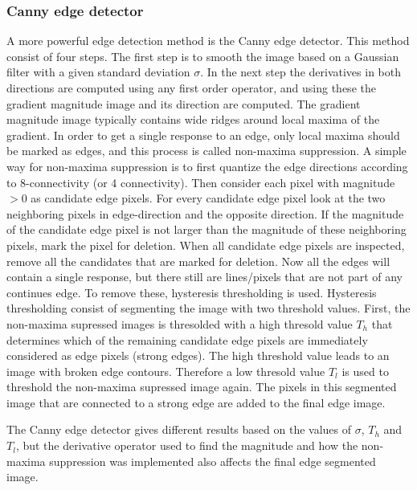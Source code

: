 \subsubsection{Canny edge detector}
A more powerful edge detection method is the Canny edge detector. This method consist of four steps. The first step is to smooth the image based on a Gaussian filter with a given standard deviation \(\sigma\). In the next step the derivatives in both directions are computed using any first order operator, and using these the gradient magnitude image and its direction are computed. The gradient magnitude image typically contains wide ridges around local maxima of the gradient. In order to get a single response to an edge, only local maxima should be marked as edges, and this process is called non-maxima suppression. A simple way for non-maxima suppression is to first quantize the edge directions according to 8-connectivity (or 4 connectivity). Then consider each pixel with magnitude \(> 0\) as candidate edge pixels. For every candidate edge pixel look at the two neighboring pixels in edge-direction and the opposite direction. If the magnitude of the candidate edge pixel is not larger than the magnitude of these neighboring pixels, mark the pixel for deletion. When all candidate edge pixels are inspected, remove all the candidates that are marked for deletion. Now all the edges will contain a single response, but there still are lines/pixels that are not part of any continues edge. To remove these, hysteresis thresholding is used. Hysteresis thresholding consist of segmenting the image with two threshold values. First, the non-maxima supressed images is thresolded with a high thresold value \(T_h\) that determines which of the remaining candidate edge pixels are immediately considered as edge pixels (strong edges). The high threshold value leads to an image with broken edge contours. Therefore a low thresold value \(T_l\) is used to threshold the non-maxima supressed image again. The pixels in this segmented image that are connected to a strong edge are added to the final edge image.

The Canny edge detector gives different results based on the values of \(\sigma\), \(T_h\) and \(T_l\), but the derivative operator used to find the magnitude and how the non-maxima suppression was implemented also affects the final edge segmented image.
